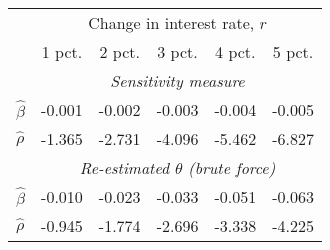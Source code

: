 \begin{tabular}{l*{5}{c}} \toprule 
& \multicolumn{5}{c}{ Change in interest rate, $r$ } \\ \cmidrule(lr){2-6}  
& 1 pct. & 2 pct. & 3 pct. & 4 pct. & 5 pct. \\ \midrule 
& \multicolumn{5}{c}{ \emph{Sensitivity measure} } \\ \cmidrule(lr){2-6}  
 $\hat{\beta}$ & -0.001 & -0.002 & -0.003 & -0.004 & -0.005 \\
 $\hat{\rho}$ & -1.365 & -2.731 & -4.096 & -5.462 & -6.827 \\\cmidrule(lr){2-6}  
& \multicolumn{5}{c}{ \emph{Re-estimated $\theta$ (brute force)} } \\ \cmidrule(lr){2-6}  
 $\hat{\beta}$ & -0.010 & -0.023 & -0.033 & -0.051 & -0.063 \\ 
 $\hat{\rho}$  & -0.945  & -1.774  & -2.696  & -3.338  & -4.225 \\ \bottomrule  \end{tabular} 
